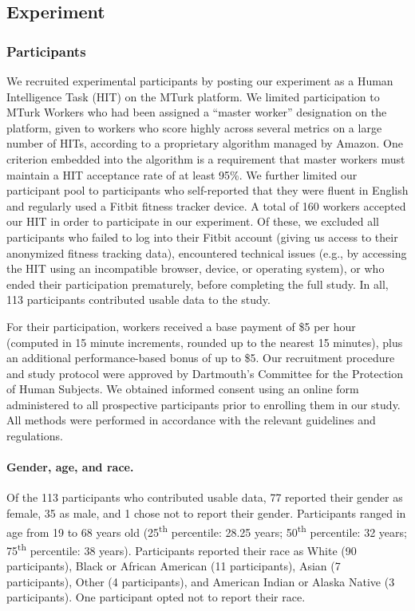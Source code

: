 \documentclass[10pt]{article}
\begin{document}
    
    
\subsection*{Experiment}
\subsubsection*{Participants}
We recruited experimental participants by posting our experiment as a
Human Intelligence Task (HIT) on the MTurk platform.
We limited participation to MTurk Workers who had been
assigned a ``master worker'' designation on the platform, given to workers
who score highly across several metrics on a large number of HITs,
according to a proprietary algorithm managed by Amazon.  One criterion
embedded into the algorithm is a requirement that master
workers must maintain a HIT acceptance rate of at least 95\%.  We further
limited our participant pool to participants who self-reported that
they were fluent in English and regularly used a Fitbit fitness
tracker device.  A total of 160 workers accepted our HIT in order to
participate in our experiment.  Of these, we excluded all participants
who failed to log into their Fitbit account (giving us access to their
anonymized fitness tracking data), encountered technical issues (e.g.,
by accessing the HIT using an incompatible browser, device, or
operating system), or who ended their participation prematurely,
before completing the full study.  In all, 113 participants
contributed usable data to the study.

For their participation, workers received a base payment of \$5 per
hour (computed in 15 minute increments, rounded up to the nearest 15
minutes), plus an additional performance-based bonus of up to \$5.
Our recruitment procedure and study protocol were approved by
Dartmouth's Committee for the Protection of Human Subjects.  We
obtained informed consent using an online form administered to all
prospective participants prior to enrolling them in our study.  All
methods were performed in accordance with the relevant guidelines and
regulations.

\paragraph{Gender, age, and race.}
Of the 113 participants who contributed usable data, 77 reported their gender as female, 35 as
male, and 1 chose not to report their gender.  Participants ranged in
age from 19 to 68 years old (25\textsuperscript{th} percentile: 28.25
years; 50\textsuperscript{th} percentile: 32 years;
75\textsuperscript{th} percentile: 38 years).  Participants reported
their race as White (90 participants), Black or African American (11
participants), Asian (7 participants), Other (4 participants), and
American Indian or Alaska Native (3 participants).  One participant
opted not to report their race.
\end{document}
